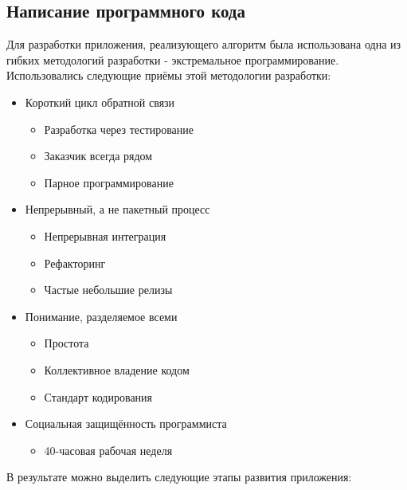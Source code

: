 \subsection{Написание программного кода}

Для разработки приложения, реализующего алгоритм была использована одна из
гибких методологий разработки - экстремальное программирование.\\

Использовались следующие приёмы этой методологии разработки:

\begin{itemize}
  \item Короткий цикл обратной связи
    \begin{itemize}
      \item Разработка через тестирование
      \item Заказчик всегда рядом
      \item Парное программирование
    \end{itemize}
  \item Непрерывный, а не пакетный процесс
    \begin{itemize}
      \item Непрерывная интеграция
      \item Рефакторинг
      \item Частые небольшие релизы
    \end{itemize}
  \item Понимание, разделяемое всеми
    \begin{itemize}
      \item Простота
      \item Коллективное владение кодом
      \item Стандарт кодирования
    \end{itemize}
    \item Социальная защищённость программиста
      \begin{itemize}
        \item 40-часовая рабочая неделя
      \end{itemize}
\end{itemize}

В результате можно выделить следующие этапы развития приложения:\\

